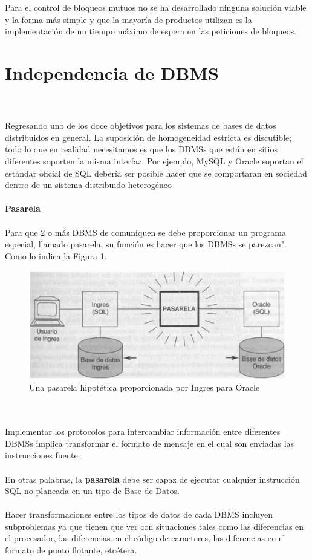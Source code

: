 \documentclass[10pt,a4paper,oneside]{article}
\begin{document}
\begin {itemize}
\\\\Para el control de bloqueos mutuos no se ha desarrollado ninguna soluci\'on viable y la forma m\'as simple y que la mayor\'ia de productos utilizan es la implementaci\'on de un tiempo m\'aximo de espera en las peticiones de bloqueos.



\section{Independencia de DBMS}
\\\\Regresando uno  de los doce objetivos para los sistemas de bases de datos distribuidos en general. La suposici\'on de homogeneidad estricta es discutible; todo lo que en realidad necesitamos es que los DBMSs que est\'an en sitios diferentes soporten la misma interfaz. Por ejemplo, MySQL y Oracle soportan el est\'andar oficial de SQL deber\'ia ser posible hacer que se comportaran en sociedad dentro de un sistema distribuido heterog\'eneo
\\\\ {\bf Pasarela}
\\\\Para que 2 o m\'as DBMS de comuniquen se debe proporcionar un programa especial, llamado pasarela, su funci\'on es hacer que los DBMSs se parezcan". Como lo indica la Figura 1.
\\
\begin {figure} [¡h]
\centering
\includegraphics [width=0.4 \textwidth] {figx}
\caption {Una pasarela hipot\'etica proporcionada por Ingres para Oracle}
\label {fig:figx}
\end {figure}
\\\\Implementar los protocolos para intercambiar informaci\'on entre diferentes DBMSs implica transformar el formato de mensaje en el cual son enviadas las instrucciones fuente.
\\\\En otras palabras, la {\bf pasarela} debe ser capaz de ejecutar cualquier instrucci\'on SQL no planeada en un tipo de Base de Datos. 
\\\\Hacer transformaciones entre los tipos de datos de cada DBMS incluyen subproblemas ya que tienen que ver con situaciones tales como las diferencias en el procesador,  las diferencias en el c\'odigo de caracteres, las diferencias en el formato de punto flotante, etc\'etera.

\end{itemize}
\end{document}
